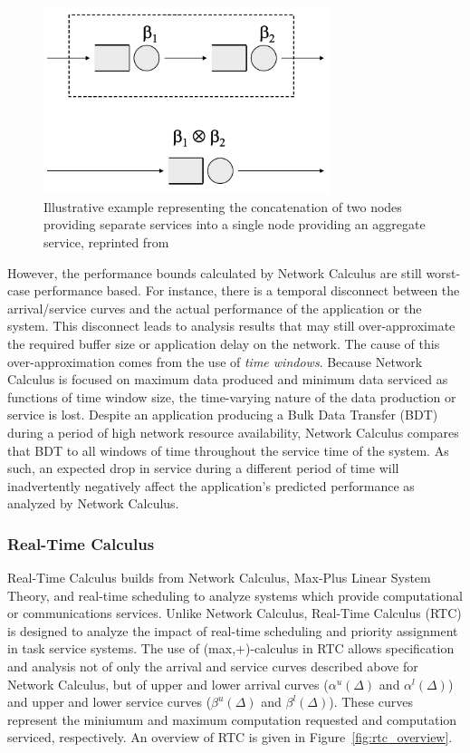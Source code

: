 \begin{figure}[htb]
  \centering
  \includegraphics[width=0.75\textwidth]{figs/nc_concatenation.png}
  \caption{Illustrative example representing the concatenation of two
    nodes providing separate services into a single node providing an
    aggregate service, reprinted from \cite{NCBook}}
  \label{fig:nc_concatenation}
\end{figure}

However, the performance bounds calculated by Network Calculus are
still worst-case performance based.  For instance, there is a temporal
disconnect between the arrival/service curves and the actual
performance of the application or the system.  This disconnect leads
to analysis results that may still over-approximate the required
buffer size or application delay on the network.  The cause of this
over-approximation comes from the use of \emph{time windows}.  Because
Network Calculus is focused on maximum data produced and minimum data
serviced as functions of time window size, the time-varying nature of
the data production or service is lost.  Despite an application
producing a Bulk Data Transfer (BDT) during a period of high network
resource availability, Network Calculus compares that BDT to all
windows of time throughout the service time of the system.  As such,
an expected drop in service during a different period of time will
inadvertently negatively affect the application's predicted
performance as analyzed by Network Calculus.

\subsubsection{Real-Time Calculus}
Real-Time Calculus\cite{Thiele00real-timecalculus} builds from Network
Calculus, Max-Plus Linear System Theory, and real-time scheduling to
analyze systems which provide computational or communications
services.  Unlike Network Calculus, Real-Time Calculus (RTC) is
designed to analyze the impact of real-time scheduling and priority
assignment in task service systems.  The use of (max,+)-calculus in
RTC allows specification and analysis not of only the arrival and
service curves described above for Network Calculus, but of upper and
lower arrival curves ($\alpha^u(\Delta)$ and $\alpha^l(\Delta)$) and
upper and lower service curves ($\beta^u(\Delta)$ and
$\beta^l(\Delta)$).  These curves represent the miniumum and maximum
computation requested and computation serviced, respectively.  An
overview of RTC is given in Figure~\ref{fig:rtc_overview}.

